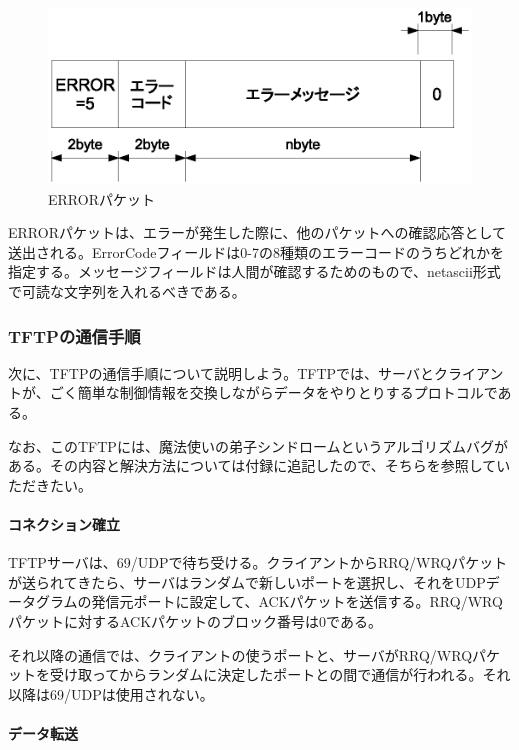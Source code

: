 \begin{figure}[htbp]
	\includegraphics[width=12cm,clip]{draw/tftp_op4.eps}
	\caption{ERRORパケット}
	\label{fig:ftfp_op4}
\end{figure}


ERRORパケットは、エラーが発生した際に、他のパケットへの確認応答として送出される。ErrorCodeフィールドは0-7の8種類のエラーコードのうちどれかを指定する。メッセージフィールドは人間が確認するためのもので、netascii形式で可読な文字列を入れるべきである。


\subsubsection{TFTPの通信手順}

次に、TFTPの通信手順について説明しよう。TFTPでは、サーバとクライアントが、ごく簡単な制御情報を交換しながらデータをやりとりするプロトコルである。

なお、このTFTPには、魔法使いの弟子シンドロームというアルゴリズムバグがある。その内容と解決方法については付録に追記したので、そちらを参照していただきたい。

\paragraph{コネクション確立}

TFTPサーバは、69/UDPで待ち受ける。クライアントからRRQ/WRQパケットが送られてきたら、サーバはランダムで新しいポートを選択し、それをUDPデータグラムの発信元ポートに設定して、ACKパケットを送信する。RRQ/WRQパケットに対するACKパケットのブロック番号は0である。

それ以降の通信では、クライアントの使うポートと、サーバがRRQ/WRQパケットを受け取ってからランダムに決定したポートとの間で通信が行われる。それ以降は69/UDPは使用されない。

\paragraph{データ転送}

